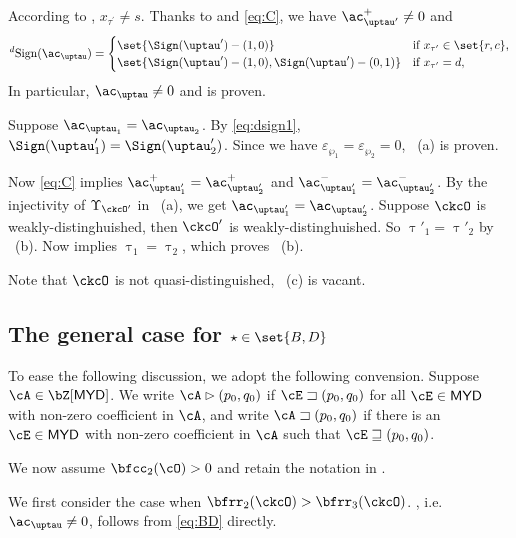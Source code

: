 \documentclass[12pt,a4paper]{amsart}
\def\MYD{{\mathsf{MYD}}}
\def\pac#1{\ac_{#1}^+}
\def\nac#1{\ac_{#1}^-}
\numberwithin{equation}{section}
\theoremstyle{remark}
\def\dsign{{}^d\mathrm{Sign}}
\def\uptaup{\uptau^{\prime}}
\def\taup{\tau^{\prime}}
\begin{document}
According to ,  $x_{\taup}\neq s$.
Thanks to  and \eqref{eq:C}, we have $\pac{\uptaup} \neq 0$ and
\begin{equation}
\label{eq:dsign1}
  \dsign(\ac_{\uptau}) =
  \begin{cases}
    \set{ \Sign(\uptau') - (1,0)} & \text{if } x_{\taup} \in \set{r,c},\\
    \set{ \Sign(\uptau') - (1,0), \Sign(\uptau')-(0,1)} & \text{if
    } x_{\taup} = d, \\
  \end{cases}
\end{equation}
In particular,
$\ac_{\uptau}\neq 0$ and  is proven.


\smallskip


Suppose $\ac_{\uptau_{1}}=\ac_{\uptau_{2}}$. By \eqref{eq:dsign1},
$\Sign(\uptau'_{1})=\Sign(\uptau'_{2})$. Since we have
$\varepsilon_{\wp_{1}}=\varepsilon_{\wp_{2}}=0$, ~(a) is proven.


\smallskip

Now \eqref{eq:C} implies $\pac{\uptau'_{1}}=\pac{\uptau'_{2}}$ and
$\nac{\uptau'_{1}}=\nac{\uptau'_{2}}$.
By the injectivity of $\Upsilon_{\ckcO'}$ in ~(a), we get
$\ac_{\uptau'_{1}}=\ac_{\uptau'_{2}}$.
Suppose $\ckcO$ is weakly-distinghuished, then $\ckcO'$ is
weakly-distinghuished.
So $\uptau'_{1}=\uptau'_{2}$ by ~(b).
Now  implies $\uptau_{1}=\uptau_{2}$, which proves ~(b).


\smallskip

Note that $\ckcO$ is not quasi-distinguished, ~(c) is vacant.


\subsection{The general case for $\star\in \set{B,D}$}

To ease the following discussion, we adopt the following convension.
Suppose $\cA\in \bZ[\MYD]$. We write $\cA\rhd (p_{0},q_{0})$ if
$\cE \sqsupset (p_{0},q_{0})$ for all $\cE\in \MYD$ with non-zero coefficient in
$\cA$, and write $\cA \sqsupset (p_{0},q_{0})$ if there is an $\cE\in \MYD$ with
non-zero coefficient in $\cA$ such that $\cE\sqsupseteq (p_{0},q_{0})$.

\medskip

We now assume $\bfcc_{2}(\cO)>0$ and retain the notation in .

We first consider the case when $\bfrr_{2}(\ckcO)>\bfrr_{3}(\ckcO)$.
, i.e. $\ac_{\uptau}\neq 0$, follows from \eqref{eq:BD} directly.
\end{document}
